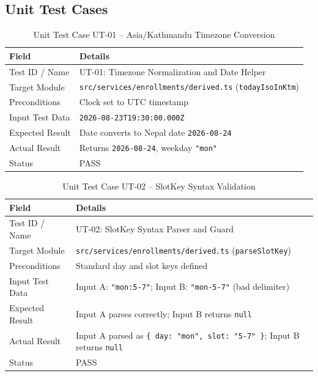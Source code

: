 \documentclass[12pt]{report}
\begin{document}
\subsection{Unit Test Cases}

\begin{table}[H]
\centering
\caption{Unit Test Case UT-01 -- Asia/Kathmandu Timezone Conversion}
\label{tab:ut01}
\small
\begin{tabular}{|p{3.2cm}|p{11.5cm}|}
\hline
\textbf{Field} & \textbf{Details} \\
\hline
Test ID / Name & UT-01: Timezone Normalization and Date Helper \\
\hline
Target Module & \texttt{src/services/enrollments/derived.ts} (\texttt{todayIsoInKtm}) \\
\hline
Preconditions & Clock set to UTC timestamp \\
\hline
Input Test Data & \texttt{2026-08-23T19:30:00.000Z} \\
\hline
Expected Result & Date converts to Nepal date \texttt{2026-08-24} \\
\hline
Actual Result & Returns \texttt{2026-08-24}, weekday \texttt{"mon"} \\
\hline
Status & PASS \\
\hline
\end{tabular}
\end{table}

\begin{table}[H]
\centering
\caption{Unit Test Case UT-02 -- SlotKey Syntax Validation}
\label{tab:ut02}
\small
\begin{tabular}{|p{3.2cm}|p{11.5cm}|}
\hline
\textbf{Field} & \textbf{Details} \\
\hline
Test ID / Name & UT-02: SlotKey Syntax Parser and Guard \\
\hline
Target Module & \texttt{src/services/enrollments/derived.ts} (\texttt{parseSlotKey}) \\
\hline
Preconditions & Standard day and slot keys defined \\
\hline
Input Test Data & Input A: \texttt{"mon:5-7"}; Input B: \texttt{"mon-5-7"} (bad delimiter) \\
\hline
Expected Result & Input A parses correctly; Input B returns \texttt{null} \\
\hline
Actual Result & Input A parsed as \texttt{\{ day: "mon", slot: "5-7" \}}; Input B returns \texttt{null} \\
\hline
Status & PASS \\
\hline
\end{tabular}
\end{table}
\end{document}
